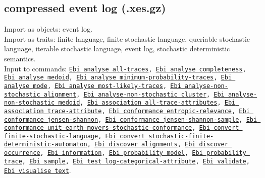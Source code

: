 {\subsection{compressed event log (.xes.gz)}
Import as objects: event log.
\\Import as traits: finite language, finite stochastic language, queriable stochastic language, iterable stochastic language, event log, stochastic deterministic semantics.
\\Input to commands: \texttt{\hyperref[command:Ebi analyse all-traces]{Ebi analyse all-traces}, \hyperref[command:Ebi analyse completeness]{Ebi analyse completeness}, \hyperref[command:Ebi analyse medoid]{Ebi analyse medoid}, \hyperref[command:Ebi analyse minimum-probability-traces]{Ebi analyse minimum-probability-traces}, \hyperref[command:Ebi analyse mode]{Ebi analyse mode}, \hyperref[command:Ebi analyse most-likely-traces]{Ebi analyse most-likely-traces}, \hyperref[command:Ebi analyse-non-stochastic alignment]{Ebi analyse-non-stochastic alignment}, \hyperref[command:Ebi analyse-non-stochastic cluster]{Ebi analyse-non-stochastic cluster}, \hyperref[command:Ebi analyse-non-stochastic medoid]{Ebi analyse-non-stochastic medoid}, \hyperref[command:Ebi association all-trace-attributes]{Ebi association all-trace-attributes}, \hyperref[command:Ebi association trace-attribute]{Ebi association trace-attribute}, \hyperref[command:Ebi conformance entropic-relevance]{Ebi conformance entropic-relevance}, \hyperref[command:Ebi conformance jensen-shannon]{Ebi conformance jensen-shannon}, \hyperref[command:Ebi conformance jensen-shannon-sample]{Ebi conformance jensen-shannon-sample}, \hyperref[command:Ebi conformance unit-earth-movers-stochastic-conformance]{Ebi conformance unit-earth-movers-stochastic-conformance}, \hyperref[command:Ebi convert finite-stochastic-language]{Ebi convert finite-stochastic-language}, \hyperref[command:Ebi convert stochastic-finite-deterministic-automaton]{Ebi convert stochastic-finite-deterministic-automaton}, \hyperref[command:Ebi discover alignments]{Ebi discover alignments}, \hyperref[command:Ebi discover occurrence]{Ebi discover occurrence}, \hyperref[command:Ebi information]{Ebi information}, \hyperref[command:Ebi probability model]{Ebi probability model}, \hyperref[command:Ebi probability trace]{Ebi probability trace}, \hyperref[command:Ebi sample]{Ebi sample}, \hyperref[command:Ebi test log-categorical-attribute]{Ebi test log-categorical-attribute}, \hyperref[command:Ebi validate]{Ebi validate}, \hyperref[command:Ebi visualise text]{Ebi visualise text}}.
}
